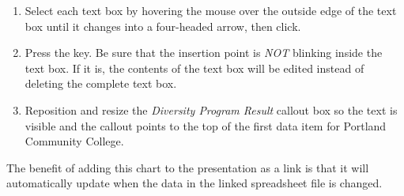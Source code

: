 \begin{enumbox}
	\begin{enumerate}
		\item Select each text box by hovering the mouse over the outside edge of the text box until it changes into a four-headed arrow, then click.
		\item Press the  key. Be sure that the insertion point is \textit{NOT} blinking inside the text box. If it is, the contents of the text box will be edited instead of deleting the complete text box.
		\item Reposition and resize the \textit{Diversity Program Result} callout box so the text is visible and the callout points to the top of the first data item for Portland Community College.
	\end{enumerate}
\end{enumbox}
	
The benefit of adding this chart to the presentation as a link is that it will automatically update when the data in the linked spreadsheet file is changed.

